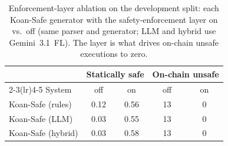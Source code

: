 \begin{table}[t]
\centering
\caption{Enforcement-layer ablation on the development split: each Koan-Safe generator with the safety-enforcement layer on vs.\ off (same parser and generator; LLM and hybrid use Gemini~3.1~FL). The layer is what drives on-chain unsafe executions to zero.}
\label{tab:enforcement-ablation}
\begin{tabular}{lcccc}
\toprule
 & \multicolumn{2}{c}{Statically safe} & \multicolumn{2}{c}{On-chain unsafe} \\
\cmidrule(lr){2-3}\cmidrule(lr){4-5}
System & off & on & off & on \\
\midrule
Koan-Safe (rules) & 0.12 & 0.56 & 13 & 0 \\
Koan-Safe (LLM) & 0.03 & 0.55 & 13 & 0 \\
Koan-Safe (hybrid) & 0.03 & 0.58 & 13 & 0 \\
\bottomrule
\end{tabular}
\end{table}
